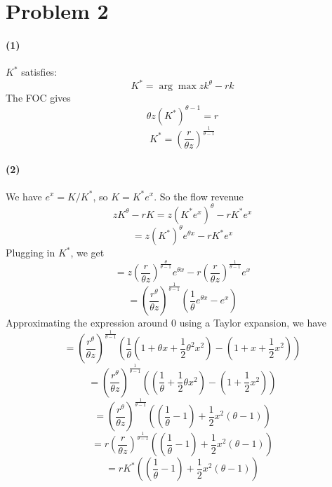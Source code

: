 \documentclass[10pt,letter]{article}
\newcommand{\problem}[1]{\section*{Problem #1}}
\newcommand{\problempart}[1]{\paragraph{#1}}
\begin{document}
\problem{2}
\problempart{(1)}
$K^*$ satisfies:
\[ K^* = \arg \max z k^\theta - rk \]
The FOC gives
\[ \theta z (K^*)^{\theta - 1} = r \]
\[ K^* = \left(\frac{r}{\theta z}\right)^{\frac{1}{\theta - 1}}\]
\problempart{(2)}
We have $e^x = K / K^*$, so $K = K^* e^x$. So the flow revenue
\[ zK^\theta - rK = z(K^* e^x)^\theta - r K^* e^x \]
\[ = z(K^*)^\theta e^{\theta x} - r K^* e^x \]
Plugging in $K^*$, we get
\[ = z\left(\frac{r}{\theta z}\right)^{\frac{\theta}{\theta - 1}} e^{\theta x} - r \left(\frac{r}{\theta z}\right)^{\frac{1}{\theta - 1}} e^x \]
\[ = \left(\frac{r^\theta}{\theta z}\right)^{\frac{1}{\theta-1}} \left( \frac{1}{\theta} e^{\theta x} - e^x \right)\]
Approximating the expression around 0 using a Taylor expansion, we have
\[ = \left(\frac{r^\theta}{\theta z}\right)^{\frac{1}{\theta-1}}\left(\frac{1}{\theta}\left(1 + \theta x + \frac{1}{2}\theta^2 x^2\right) - \left(1 + x + \frac{1}{2}x^2\right)\right)\]
\[ = \left(\frac{r^\theta}{\theta z}\right)^{\frac{1}{\theta-1}}\left(\left(\frac{1}{\theta} + \frac{1}{2}\theta x^2\right) - \left(1 + \frac{1}{2}x^2\right)\right)\]
\[ = \left(\frac{r^\theta}{\theta z}\right)^{\frac{1}{\theta-1}}\left(\left(\frac{1}{\theta} -1 \right) + \frac{1}{2}x^2\left( \theta -  1\right)\right)\]
\[ = r\left(\frac{r}{\theta z}\right)^{\frac{1}{\theta-1}}\left(\left(\frac{1}{\theta} -1 \right) + \frac{1}{2}x^2\left( \theta -  1\right)\right)\]
\[ = rK^*\left(\left(\frac{1}{\theta} -1 \right) + \frac{1}{2}x^2\left( \theta -  1\right)\right)\]
\end{document}

